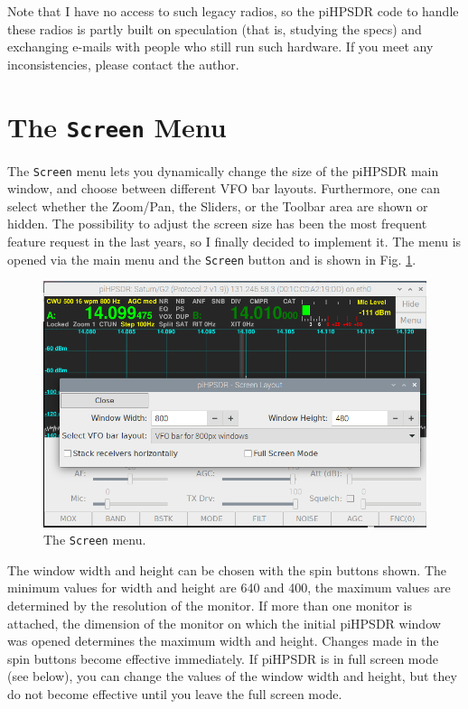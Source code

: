 \documentclass[12pt]{book}
\def\bltt#1{\texttt{\color{blue}#1}}
\begin{document}
Note that I have no access to such legacy radios, so the piHPSDR code to handle these radios
is partly built on speculation (that is, studying the specs) and exchanging e-mails with
people who still run such hardware. If you meet any inconsistencies, please contact
the author.

\section{The \texttt{Screen} Menu}

The \bltt{Screen} menu lets you dynamically change the size of the piHPSDR main
window, and choose between different VFO bar layouts. Furthermore, one
can select whether the Zoom/Pan, the Sliders, or the Toolbar area are shown or hidden.
The possibility to adjust
the screen size has been the most frequent feature request in the last years,
so I finally decided to implement it. The menu is opened
via the main menu and the \bltt{Screen} button and is shown in Fig. \ref{fig:ScreenMenu}.

\begin{figure}[ht]
\center
\includegraphics[width=12cm]{ScreenMenu.png}
\caption{The \bltt{Screen} menu.}
\label{fig:ScreenMenu}
\end{figure}

The window width and height can be chosen with the spin buttons shown. The minimum
values for width and height are 640 and 400, the maximum values are determined by
the resolution of the monitor. If more than one monitor is attached, the dimension
of the monitor on which the initial piHPSDR window was opened determines
the maximum width and height. Changes made in the spin buttons become effective
immediately. If piHPSDR is in full screen mode (see below), you can change the
values of the window width and height, but they do not become effective until
you leave the full screen mode.
\end{document}
